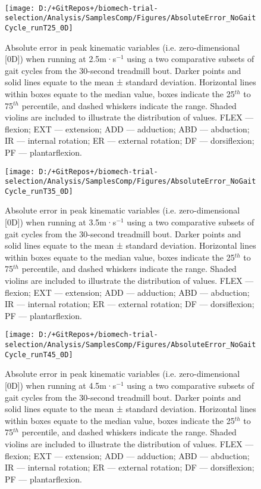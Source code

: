 \documentclass[]{elsarticle} %
\begin{document}
~

\begin{figure}

{\centering \texttt{[image: D:/+GitRepos+/biomech-trial-selection/Analysis/SamplesComp/Figures/AbsoluteError\_NoGaitCycle\_runT25\_0D]} 

}

\caption{Absolute error in peak kinematic variables (i.e. zero-dimensional [0D]) when running at 2.5m·s$^{-1}$ using a two comparative subsets of gait cycles from the 30-second treadmill bout. Darker points and solid lines equate to the mean ± standard deviation. Horizontal lines within boxes equate to the median value, boxes indicate the 25$^{th}$ to 75$^{th}$ percentile, and dashed whiskers indicate the range. Shaded violins are included to illustrate the distribution of values. FLEX — flexion; EXT — extension; ADD — adduction; ABD — abduction; IR — internal rotation; ER — external rotation; DF — dorsiflexion; PF — plantarflexion.}\label{fig:samplesComp-runT25-0D}
\end{figure}

\begin{figure}

{\centering \texttt{[image: D:/+GitRepos+/biomech-trial-selection/Analysis/SamplesComp/Figures/AbsoluteError\_NoGaitCycle\_runT35\_0D]} 

}

\caption{Absolute error in peak kinematic variables (i.e. zero-dimensional [0D]) when running at 3.5m·s$^{-1}$ using a two comparative subsets of gait cycles from the 30-second treadmill bout. Darker points and solid lines equate to the mean ± standard deviation. Horizontal lines within boxes equate to the median value, boxes indicate the 25$^{th}$ to 75$^{th}$ percentile, and dashed whiskers indicate the range. Shaded violins are included to illustrate the distribution of values. FLEX — flexion; EXT — extension; ADD — adduction; ABD — abduction; IR — internal rotation; ER — external rotation; DF — dorsiflexion; PF — plantarflexion.}\label{fig:samplesComp-runT35-0D}
\end{figure}

\begin{figure}

{\centering \texttt{[image: D:/+GitRepos+/biomech-trial-selection/Analysis/SamplesComp/Figures/AbsoluteError\_NoGaitCycle\_runT45\_0D]} 

}

\caption{Absolute error in peak kinematic variables (i.e. zero-dimensional [0D]) when running at 4.5m·s$^{-1}$ using a two comparative subsets of gait cycles from the 30-second treadmill bout. Darker points and solid lines equate to the mean ± standard deviation. Horizontal lines within boxes equate to the median value, boxes indicate the 25$^{th}$ to 75$^{th}$ percentile, and dashed whiskers indicate the range. Shaded violins are included to illustrate the distribution of values. FLEX — flexion; EXT — extension; ADD — adduction; ABD — abduction; IR — internal rotation; ER — external rotation; DF — dorsiflexion; PF — plantarflexion.}\label{fig:samplesComp-runT45-0D}
\end{figure}
\end{document}
